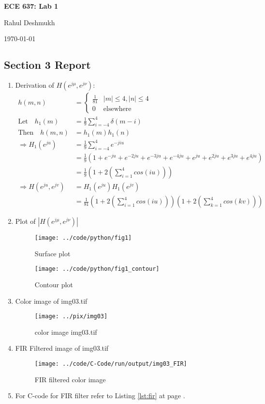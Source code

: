 \documentclass[a4paper,11pt]{article}
\newcommand{\reflst}[1]{Listing \ref{#1} at page \pageref{#1}}
\begin{document}
\begin{center}
\Large{\textbf{ECE 637: Lab 1}}

Rahul Deshmukh

\today
\end{center}

\subsection*{Section 3 Report} 

\begin{enumerate}
\item Derivation of $H(e^{j\mu},e^{j\nu})$:
\begin{align*}
 h(m,n) &= 
 \begin{cases}
 \frac{1}{81} & |m|\leq 4, |n|\leq 4\\
 0 & \text{elsewhere}
 \end{cases}\\
 \text{Let}\quad h_1(m) &= \frac{1}{9}\sum_{i=-4}^4 \delta(m-i)\\
 \text{Then}\quad h(m,n)&=h_1(m)h_1(n)\\
 \Rightarrow H_1(e^{ju}) &= \frac{1}{9}\sum_{i=-4}^4 e^{-jiu}\\
 &= \frac{1}{9} (1+ e^{-ju} + e^{-2ju}+ e^{-3ju} + e^{-4ju} +
 e^{ju} + e^{2ju}+ e^{3ju} + e^{4ju})\\
 &= \frac{1}{9}(1+ 2(\sum_{i=1}^{4}cos(iu)) )\\
 \Rightarrow H(e^{ju},e^{jv}) &= H_1(e^{ju}) H_1(e^{jv})\\
 &= \frac{1}{81}(1+ 2(\sum_{i=1}^{4}cos(iu)))(1+ 2(\sum_{k=1}^{4}cos(kv)) )
\end{align*}



\newpage
\item Plot of $|H(e^{j\mu},e^{j\nu})|$
\begin{figure}[!hp]
 \centering
 \texttt{[image: ../code/python/fig1]}
 \caption{Surface plot}
\end{figure}

\begin{figure}[!hp]
 \centering
 \texttt{[image: ../code/python/fig1\_contour]}
 \caption{Contour plot}
\end{figure}

\newpage
\item Color image of img03.tif
\begin{figure}[!hp]
 \centering
 \texttt{[image: ../pix/img03]}
 \caption{color image img03.tif}
\end{figure}

\newpage
\item FIR Filtered image of img03.tif
\begin{figure}[!hp]
 \centering
 \texttt{[image: ../code/C-Code/run/output/img03\_FIR]}
 \caption{FIR filtered color image}
 \end{figure}

 \item For C-code for FIR filter refer to \reflst{lst:fir}.
\end{enumerate}
\end{document}
